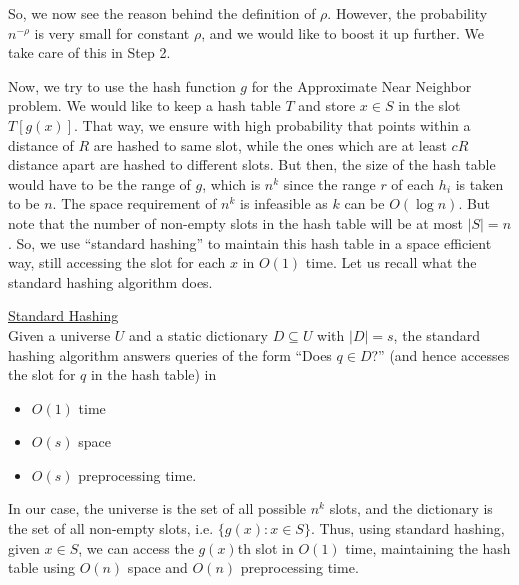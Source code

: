 \documentclass[11pt]{article}
\begin{document}
So, we now see the reason behind the definition of $\rho$. However, the probability $n^{-\rho}$ is very small for constant $\rho$, and we would like to boost it up further. We take care of this in Step 2.

Now, we try to use the hash function $g$ for the {\sc Approximate Near Neighbor} problem. We would like to keep a hash table $T$ and store $x\in S$ in the slot $T[g(x)]$. That way, we ensure with high probability that points within a distance of $R$ are hashed to same slot, while the ones which are at least $cR$ distance apart are hashed to different slots. But then, the size of the hash table would have to be the range of $g$, which is $n^k$ since the range $r$ of each $h_i$ is taken to be $n$. The space requirement of $n^k$ is infeasible as $k$ can be $O(\log n)$. But note that the number of non-empty slots in the hash table will be at most $|S|=n$. So, we use ``standard hashing'' to maintain this hash table in a space efficient way, still accessing the slot for each $x$ in $O(1)$ time. Let us recall what the standard hashing algorithm does.

\begin{mdframed}[backgroundcolor=blue!05,topline=false,bottomline=false,leftline=false,rightline=false] \underline{\sc Standard Hashing}\\
Given a universe $U$ and a static dictionary $D\subseteq U$ with $|D|=s$, the standard hashing algorithm answers queries of the form ``Does $q\in D?$'' (and hence accesses the slot for $q$ in the hash table) in
\begin{itemize}\item  $O(1)$ time
\item $O(s)$ space 
\item $O(s)$ preprocessing time. \end{itemize}\end{mdframed}
In our case, the universe is the set of all possible $n^k$ slots, and the dictionary is the set of all non-empty slots, i.e. $\{g(x) : x\in S\}$. Thus, using standard hashing, given $x\in S$, we can access the $g(x)$th slot in $O(1)$ time, maintaining the hash table using $O(n)$ space and $O(n)$ preprocessing time. \medskip
\end{document}
